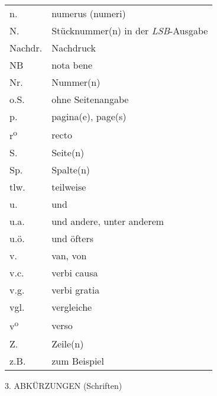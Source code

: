 \begin{longtable}{ll}
n. & numerus (numeri)\\
N. & Stücknummer(n) in der \textit{LSB}-Ausgabe\\
Nachdr. & Nachdruck\\
NB & nota bene\\
Nr. & Nummer(n)\\
o.S. & ohne Seitenangabe\\
p. & pagina(e), page(s)\\
r\textsuperscript{o} & recto\\
S. & Seite(n)\\
Sp. & Spalte(n)\\
tlw. & teilweise\\
u. & und\\
u.a. & und andere, unter anderem\\
u.ö. & und öfters\\
v. & van, von\\
v.c. & verbi causa\\
v.g. & verbi gratia\\
vgl. & vergleiche\\
v\textsuperscript{o} & verso\\
Z. & Zeile(n)\\
z.B. & zum Beispiel
\end{longtable}
\vspace{3.0ex}
\noindent\footnotesize{\uppercase{3. Abkürzungen} (Schriften)}\par
\vspace{2.0ex}

